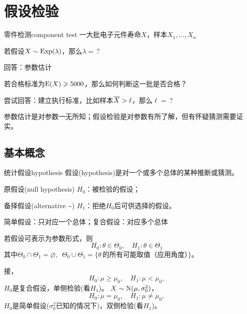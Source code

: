 \chapter{假设检验}
\begin{example}{零件检测}{component test}
	一大批电子元件寿命$X$，样本$X_1,\ldots,X_n$
	\begin{compactenum}
		\item 若假设$X \sim \operatorname{Exp}(\lambda)$，那么$\lambda = \,?$

		回答：参数估计
		\item 若合格标准为$\operatorname{E}(X) \geqslant 5000$，那么如何判断这一批是否合格？
		
		尝试回答：建立执行标准，比如样本$\overline{X} > \ell$，那么$\ell = \,?$

	\end{compactenum}
\end{example}
参数估计是对参数一无所知；假设检验是对参数有所了解，但有怀疑猜测需要证实。
\section{基本概念}
\begin{definition}{统计假设}{hypothesis}
	假设(hypothesis)是对一个或多个总体的某种推断或猜测。
	\begin{compactitem}
		\item 原假设(null hypothesis) $H_0$：被检验的假设；
		\item 备择假设(alternative \textasciitilde) $H_1$：拒绝$H_0$后可供选择的假设。
	\end{compactitem}
	简单假设：只对应一个总体；复合假设：对应多个总体
\end{definition}
若假设可表示为参数形式，则
\begin{equation}\label{eq:ps-hypothesis-pair}
	H_0:\theta \in \varTheta_0,\quad H_1:\theta \in \varTheta_1
\end{equation}
其中$\varTheta_0 \cap \varTheta_1 = \varnothing,\enspace\varTheta_0 \cup \varTheta_1 = \{\theta\,\text{的所有可能取值（应用角度）\}}$。
\begin{example}{}{}
	接，
	\[
		H_0:\mu \geqslant \mu_0,\quad H_1:\mu < \mu_0,
	\]
	$H_0$是复合假设，单侧检验(看$H_1$)。
	\tcblower
	$X \sim \operatorname{N}(\mu,\sigma_0^2)$，
	\[
		H_0:\mu = \mu_0,\quad H_1:\mu \neq \mu_0,
	\]
	$H_0$是简单假设($\sigma_0^2$已知的情况下)，双侧检验(看$H_1$)。
\end{example}

